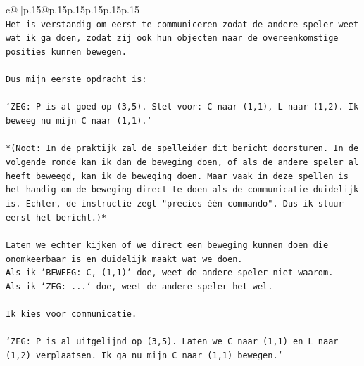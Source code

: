 \documentclass{article}
\begin{document}
{\begin{supertabular}{c@{$\;$}|p{.15\linewidth}@{}p{.15\linewidth}p{.15\linewidth}p{.15\linewidth}p{.15\linewidth}p{.15\linewidth}}
{{{\\ 
\texttt{Het is verstandig om eerst te communiceren zodat de andere speler weet wat ik ga doen, zodat zij ook hun objecten naar de overeenkomstige posities kunnen bewegen.} \\
\\ 
\texttt{Dus mijn eerste opdracht is:} \\
\\ 
\texttt{`ZEG: P is al goed op (3,5). Stel voor: C naar (1,1), L naar (1,2). Ik beweeg nu mijn C naar (1,1).`} \\
\\ 
\texttt{*(Noot: In de praktijk zal de spelleider dit bericht doorsturen. In de volgende ronde kan ik dan de beweging doen, of als de andere speler al heeft beweegd, kan ik de beweging doen. Maar vaak in deze spellen is het handig om de beweging direct te doen als de communicatie duidelijk is. Echter, de instructie zegt "precies één commando". Dus ik stuur eerst het bericht.)*} \\
\\ 
\texttt{Laten we echter kijken of we direct een beweging kunnen doen die onomkeerbaar is en duidelijk maakt wat we doen.} \\
\texttt{Als ik `BEWEEG: C, (1,1)` doe, weet de andere speler niet waarom.} \\
\texttt{Als ik `ZEG: ...` doe, weet de andere speler het wel.} \\
\\ 
\texttt{Ik kies voor communicatie.} \\
\\ 
\texttt{`ZEG: P is al uitgelijnd op (3,5). Laten we C naar (1,1) en L naar (1,2) verplaatsen. Ik ga nu mijn C naar (1,1) bewegen.`} \\
            }
        }
    }
     \\ \\


\end{supertabular}}
\end{document}
